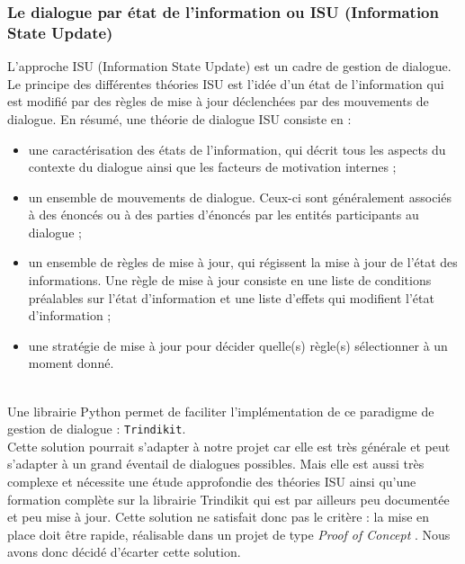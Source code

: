 \subsubsection{Le dialogue par état de l'information ou ISU (Information State Update)}

L'approche ISU (Information State Update) est un cadre de gestion de dialogue. Le principe des différentes théories ISU est l'idée d'un état de l'information qui est modifié par des règles de mise à jour déclenchées par des mouvements de dialogue. En résumé, une théorie de dialogue ISU consiste en :
\begin{itemize}
	\item une caractérisation des états de l'information, qui décrit tous les aspects du contexte du dialogue ainsi que les facteurs de motivation internes ;
	\item un ensemble de mouvements de dialogue. Ceux-ci sont généralement associés à des énoncés ou à des parties d'énoncés par les entités participants au dialogue ;
	\item un ensemble de règles de mise à jour, qui régissent la mise à jour de l'état des informations. Une règle de mise à jour consiste en une liste de conditions préalables sur l'état d'information et une liste d'effets qui modifient l'état d'information ;
	\item une stratégie de mise à jour pour décider quelle(s) règle(s) sélectionner à un moment donné.
\end{itemize}

~\\\indent
Une librairie Python permet de faciliter l'implémentation de ce paradigme de gestion de dialogue : \texttt{Trindikit}. \\
Cette solution pourrait s'adapter à notre projet car elle est très générale et peut s'adapter à un grand éventail de dialogues possibles. Mais elle est aussi très complexe et nécessite une étude approfondie des théories ISU ainsi qu'une formation complète sur la librairie Trindikit qui est par ailleurs peu documentée et peu mise à jour. Cette solution ne satisfait donc pas le critère : \og la mise en place doit être rapide, réalisable dans un projet de type \textit{Proof of Concept} \fg. Nous avons donc décidé d'écarter cette solution.

\FloatBarrier

